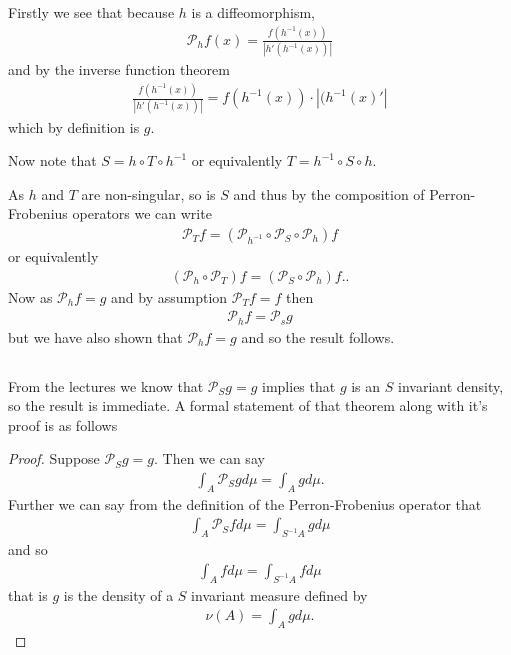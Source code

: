 \documentclass{unswmaths}
\begin{document}
Firstly we see that because $ h $ is a diffeomorphism,
\begin{align}
	\mathcal{P}_h f(x) = \frac{f(h^{-1}(x))}{|h'(h^{-1}(x))|}
\end{align}
and by the inverse function theorem
\begin{align}
	\frac{f(h^{-1}(x))}{|h'(h^{-1}(x))|} = f(h^{-1}(x)) \cdot |(h^{-1}(x)'|
\end{align}
which by definition is $ g $. 

Now note that $ S = h \circ T \circ h^{-1} $ or equivalently $ T = h^{-1} \circ S \circ h $.

As $ h $ and $ T $ are non-singular, so is $ S $ and thus by the composition of Perron-Frobenius operators
we can write
\begin{align}
    \mathcal{P}_T f = \left( \mathcal{P}_{h^{-1}} \circ \mathcal{P}_{S} \circ \mathcal{P}_{h} \right) f
\end{align}
or equivalently
\begin{align}
    \left( \mathcal{P}_{h} \circ \mathcal{P}_T \right) f = \left( \mathcal{P}_{S} \circ \mathcal{P}_{h} \right) f..
\end{align}
Now as $ \mathcal{P}_h f = g $ and by assumption $ \mathcal{P}_T f = f $ then
\begin{align}
    \mathcal{P}_h f = \mathcal{P}_s g
\end{align}
but we have also shown that $ \mathcal{P}_h f = g $
and so the result follows.
\subsection{}
From the lectures we know that $ \mathcal{P}_S g = g $ implies that $ g $ is an $ S $ invariant density, so the result is immediate.
A formal statement of that theorem along with it's proof is as follows
\begin{theorem}
\end{theorem}
\begin{proof}
  Suppose $ \mathcal{P}_{S} g = g $. Then we can say
  \begin{align}
    \int_A \mathcal{P}_S g d\mu = \int_A g d\mu.
  \end{align}
  Further we can say from the definition of the Perron-Frobenius operator that
  \begin{align}
    \int_A \mathcal{P}_{S} f d\mu = \int_{S^{-1}A} g d\mu
  \end{align}
  and so
  \begin{align}
    \int_A f d\mu = \int_{S^{-1}A} f d\mu
  \end{align}
  that is $ g $ is the density of a $ S $ invariant measure defined by
  \begin{align}
    \nu(A) = \int_{A} g d\mu.
  \end{align}
\end{proof}
\end{document}
